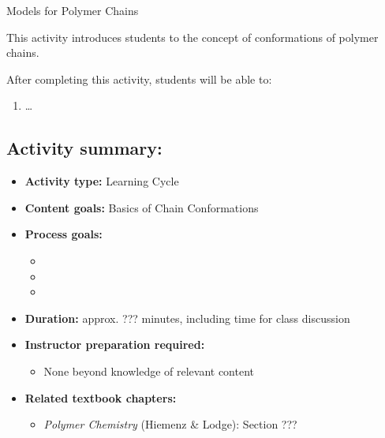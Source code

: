 %
%
%
%

\renewcommand{\figpath}{content/polymphys/chain-confs/chain-models/figs}
\renewcommand{\labelbase}{chain-models}

\begin{activity}{Models for Polymer Chains}

\begin{instructornotes}

	This activity introduces students to the concept of conformations of polymer chains.
	
	After completing this activity, students will be able to:
			\begin{enumerate}
				\item \dots
			\end{enumerate}
	
			
	\subsection*{Activity summary:}
	\begin{itemize}
		\item \textbf{Activity type:} Learning Cycle
		\item \textbf{Content goals:} Basics of Chain Conformations
		\item \textbf{Process goals:} %
			\begin{itemize}
				\item %
				\item %
				\item %
			\end{itemize}
		\item \textbf{Duration:} approx. ??? minutes, including time for class discussion
		\item \textbf{Instructor preparation required:} 
			\begin{itemize}
				\item None beyond knowledge of relevant content
			\end{itemize}
		\item \textbf{Related textbook chapters:}
			\begin{itemize}
				\item \emph{Polymer Chemistry} (Hiemenz \& Lodge): Section ???
			\end{itemize}
	\end{itemize}


\end{instructornotes}
\end{activity}
